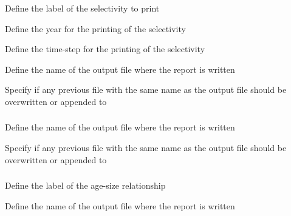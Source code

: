  {Define the label of the selectivity to print}

 {Define the year for the printing of the selectivity}

 {Define the time-step for the printing of the selectivity}

 {Define the name of the output file where the report is written}

 {Specify if any previous file with the same name as the output file should be overwritten or appended to}

\subsubsection[Print the random number seed used]{}

 {Define the name of the output file where the report is written}

 {Specify if any previous file with the same name as the output file should be overwritten or appended to}

\subsubsection[Print mean size at age]{}

 {Define the label of the age-size relationship}

 {Define the name of the output file where the report is written}

